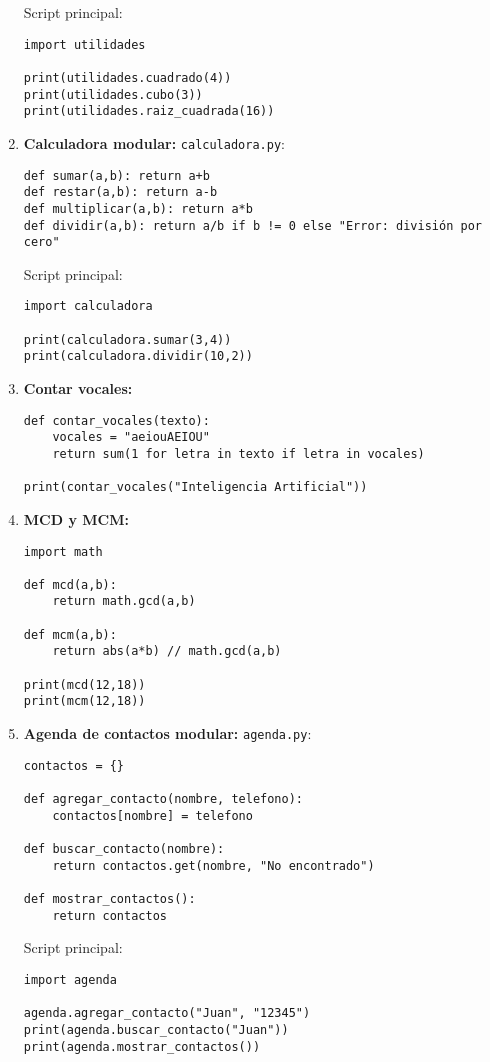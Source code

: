 \documentclass[12pt,a4paper]{article}
\begin{document}
\begin{enumerate}[label=\textbf{Ejercicio \arabic*:}, leftmargin=1.5cm]
    Script principal:
    \begin{lstlisting}
import utilidades

print(utilidades.cuadrado(4))
print(utilidades.cubo(3))
print(utilidades.raiz_cuadrada(16))
    \end{lstlisting}
    
    \item \textbf{Calculadora modular:}
    \texttt{calculadora.py}:
    \begin{lstlisting}
def sumar(a,b): return a+b
def restar(a,b): return a-b
def multiplicar(a,b): return a*b
def dividir(a,b): return a/b if b != 0 else "Error: división por cero"
    \end{lstlisting}
    
    Script principal:
    \begin{lstlisting}
import calculadora

print(calculadora.sumar(3,4))
print(calculadora.dividir(10,2))
    \end{lstlisting}
    
    \item \textbf{Contar vocales:}
    \begin{lstlisting}
def contar_vocales(texto):
    vocales = "aeiouAEIOU"
    return sum(1 for letra in texto if letra in vocales)

print(contar_vocales("Inteligencia Artificial"))
    \end{lstlisting}
    
    \item \textbf{MCD y MCM:}
    \begin{lstlisting}
import math

def mcd(a,b):
    return math.gcd(a,b)

def mcm(a,b):
    return abs(a*b) // math.gcd(a,b)

print(mcd(12,18))
print(mcm(12,18))
    \end{lstlisting}
    
    \item \textbf{Agenda de contactos modular:}
    \texttt{agenda.py}:
    \begin{lstlisting}
contactos = {}

def agregar_contacto(nombre, telefono):
    contactos[nombre] = telefono

def buscar_contacto(nombre):
    return contactos.get(nombre, "No encontrado")

def mostrar_contactos():
    return contactos
    \end{lstlisting}
    
    Script principal:
    \begin{lstlisting}
import agenda

agenda.agregar_contacto("Juan", "12345")
print(agenda.buscar_contacto("Juan"))
print(agenda.mostrar_contactos())
    \end{lstlisting}
\end{enumerate}
\end{document}
